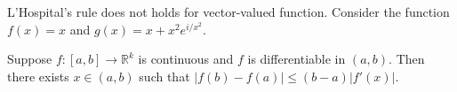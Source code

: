 \begin{remark}
L'Hospital's rule does not holds for vector-valued function. Consider the function $f(x)=x$ and $g(x)=x+x^2e^{i/x^2}$.
\end{remark}

\begin{theorem}
Suppose $f:[a,b]\to \mathbb{R}^k$ is continuous and $f$ is differentiable in $(a,b)$. Then there exists $x\in(a,b)$ such that $|f(b)-f(a)|\leq (b-a)|f'(x)|$.
\end{theorem}
\begin{hardproof}

\end{hardproof}

\clearpage